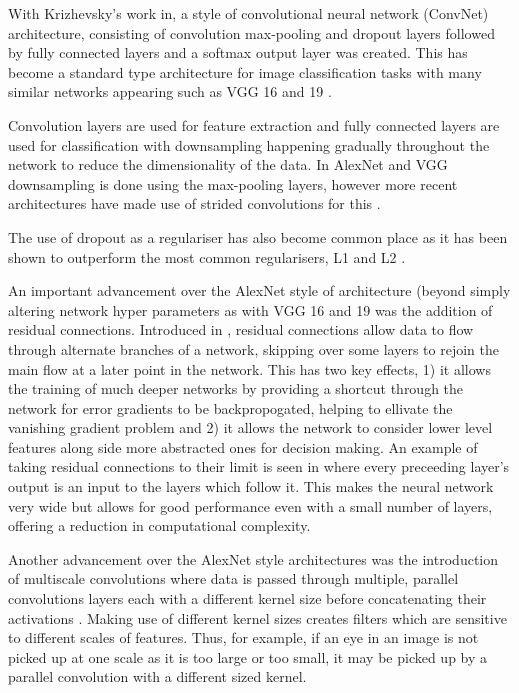 With Krizhevsky's work in\cite{krizhevsky2012imagenet}, a style of convolutional neural network (ConvNet) architecture, consisting of convolution max-pooling and dropout layers followed by fully connected layers and a softmax output layer was created. This has become a standard type architecture for image classification tasks with many similar networks appearing such as VGG 16 and 19 \cite{simonyan2014very}.

Convolution layers are used for feature extraction and fully connected layers are used for classification with downsampling happening gradually throughout the network to reduce the dimensionality of the data. In AlexNet and VGG downsampling is done using the max-pooling layers, however more recent architectures have made use of strided convolutions for this \cite{springenberg2014striving}.

The use of dropout as a regulariser has also become common place as it has been shown to outperform the most common regularisers, L1 and L2 \cite{srivastava2014dropout}.

An important advancement over the AlexNet style of architecture (beyond simply altering network hyper parameters as with VGG 16 and 19 \cite{simonyan2014very} was the addition of residual connections. Introduced in \cite{he2016deep}, residual connections allow data to flow through alternate branches of a network, skipping over some layers to rejoin the main flow at a later point in the network. This has two key effects, 1) it allows the training of much deeper networks by providing a shortcut through the network for error gradients to be backpropogated, helping to ellivate the vanishing gradient problem \cite{hochreiter1998vanishing} and 2) it allows the network to consider lower level features along side more abstracted ones for decision making.
An example of taking residual connections to their limit is seen in \cite{huang2017densely} where every preceeding layer's output is an input to the layers which follow it. This makes the neural network very wide but allows for good performance even with a small number of layers, offering a reduction in computational complexity.

Another advancement over the AlexNet style architectures was the introduction of multiscale convolutions where data is passed through multiple, parallel convolutions layers each with a different kernel size before concatenating their activations \cite{szegedy2015going}. Making use of different kernel sizes creates filters which are sensitive to different scales of features. Thus, for example, if an eye in an image is not picked up at one scale as it is too large or too small, it may be picked up by a parallel convolution with a different sized kernel.

